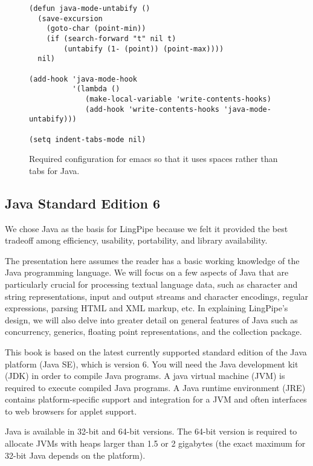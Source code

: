 \begin{figure}
{\small
\begin{verbatim}
(defun java-mode-untabify ()
  (save-excursion
    (goto-char (point-min))
    (if (search-forward "t" nil t)
        (untabify (1- (point)) (point-max))))
  nil)

(add-hook 'java-mode-hook
          '(lambda ()
             (make-local-variable 'write-contents-hooks)
             (add-hook 'write-contents-hooks 'java-mode-untabify)))

(setq indent-tabs-mode nil)\end{verbatim}}%
\caption{Required configuration for emacs so that it uses spaces rather than tabs for Java.}\label{fig:emacs-tabs}
\end{figure}



\subsection{Java Standard Edition 6}

We chose Java as the basis for LingPipe because we felt it
provided the best tradeoff among efficiency, usability, portability,
and library availability.

The presentation here assumes the reader has a basic working knowledge
of the Java programming language.  We will focus on a few aspects of
Java that are particularly crucial for processing textual language
data, such as character and string representations, input and output
streams and character encodings, regular expressions, parsing HTML and
XML markup, etc.  In explaining LingPipe's design, we will also delve
into greater detail on general features of Java such as concurrency,
generics, floating point representations, and the collection package.

This book is based on the latest currently supported standard edition
of the Java platform (Java SE), which is version 6.  You will need the
Java development kit (JDK) in order to compile Java programs.  A java
virtual machine (JVM) is required to execute compiled Java programs.
A Java runtime environment (JRE) contains platform-specific support
and integration for a JVM and often interfaces to web browsers for
applet support.

Java is available in 32-bit and 64-bit versions.  The 64-bit version
is required to allocate JVMs with heaps larger than 1.5 or 2 gigabytes
(the exact maximum for 32-bit Java depends on the platform).  


